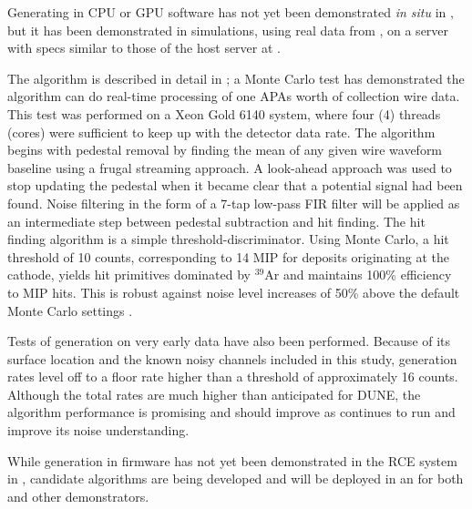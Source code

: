\label{sec:sp-daq:validation-software-trigger-primitives}

Generating  in CPU or GPU software has not
yet been demonstrated \textit{in situ} in , but it has been
demonstrated in simulations, using real data from , on a
server with specs similar to those 
of the    host server at .

The algorithm is described in detail in \cite{docid-11236}; a Monte Carlo test has demonstrated the algorithm can do real-time processing of one APAs worth
of collection wire data. This test was performed on a Xeon Gold 6140
system, where four (4) threads (cores) were sufficient to keep
up with the detector data rate. The algorithm begins with pedestal removal by
finding the mean of any given wire waveform baseline using a frugal
streaming approach. A look-ahead approach was used to stop
updating the pedestal when it became clear that a potential signal
had been found. Noise filtering in the form of a 7-tap low-pass FIR
filter will be applied as an intermediate step
between pedestal subtraction and hit finding. The hit finding
algorithm is a simple threshold-discriminator. Using Monte Carlo, a hit
threshold of 10  counts, corresponding to 1\/4 MIP for deposits originating at the cathode, yields hit primitives dominated by
$^{39}$Ar and maintains 100\% efficiency to MIP hits. This is robust against noise level 
increases of 50\% above the default  Monte Carlo settings \cite{docid-11275}. 

Tests of  generation on very early  data have also been
performed. Because of its surface
location and the known noisy channels included in this study,
  generation rates level off to a floor rate higher than a threshold
of approximately 16  counts. Although the total rates are much higher than
anticipated for DUNE, the algorithm performance is promising and should improve as  continues
to run and improve its noise understanding.

\label{sec:sp-daq:validation-firmware-trigger-primitives}

While  generation in firmware has not yet been
demonstrated in the RCE system in , candidate
algorithms are being developed and will be deployed in an 
for both  and other demonstrators. 

